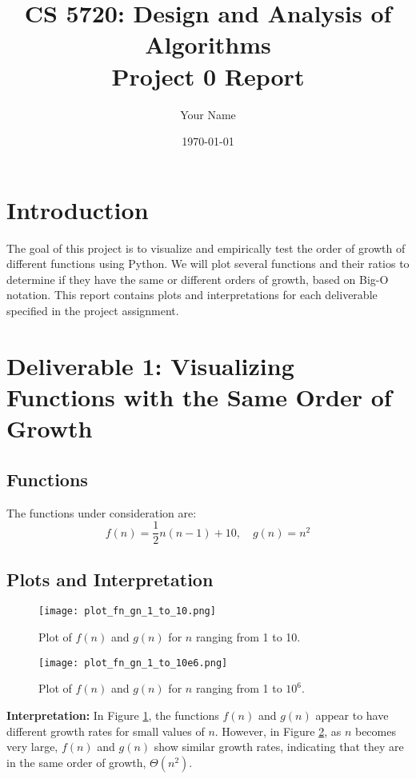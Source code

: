 \documentclass{article}
\title{CS 5720: Design and Analysis of Algorithms \\ Project 0 Report}
\author{Your Name}
\date{\today}
\begin{document}
\maketitle

\section{Introduction}

The goal of this project is to visualize and empirically test the order of growth of different functions using Python. We will plot several functions and their ratios to determine if they have the same or different orders of growth, based on Big-O notation. This report contains plots and interpretations for each deliverable specified in the project assignment.

\section{Deliverable 1: Visualizing Functions with the Same Order of Growth}

\subsection{Functions}
The functions under consideration are:
\[
f(n) = \frac{1}{2}n(n - 1) + 10, \quad g(n) = n^2
\]

\subsection{Plots and Interpretation}

\begin{figure}[H]
    \centering
    \texttt{[image: plot\_fn\_gn\_1\_to\_10.png]}
    \caption{Plot of $f(n)$ and $g(n)$ for $n$ ranging from 1 to 10.}
    \label{fig:fn_gn_1_10}
\end{figure}

\begin{figure}[H]
    \centering
    \texttt{[image: plot\_fn\_gn\_1\_to\_10e6.png]}
    \caption{Plot of $f(n)$ and $g(n)$ for $n$ ranging from 1 to $10^6$.}
    \label{fig:fn_gn_1_10e6}
\end{figure}

\textbf{Interpretation:} In Figure \ref{fig:fn_gn_1_10}, the functions $f(n)$ and $g(n)$ appear to have different growth rates for small values of $n$. However, in Figure \ref{fig:fn_gn_1_10e6}, as $n$ becomes very large, $f(n)$ and $g(n)$ show similar growth rates, indicating that they are in the same order of growth, $\Theta(n^2)$.
\end{document}
